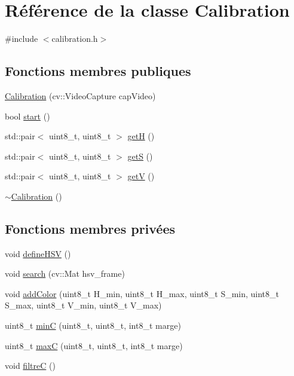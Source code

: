 \hypertarget{classCalibration}{\section{Référence de la classe Calibration}
\label{classCalibration}
}


{\ttfamily \#include $<$calibration.\-h$>$}

\subsection*{Fonctions membres publiques}
\begin{DoxyCompactItemize}
\item 
\hyperlink{classCalibration_a420bea981d91ac69161e400644ec7dd8}{Calibration} (cv\-::\-Video\-Capture cap\-Video)
\item 
bool \hyperlink{classCalibration_a066922eb7b40419ed4f850b3c6b4148d}{start} ()
\item 
std\-::pair$<$ uint8\-\_\-t, uint8\-\_\-t $>$ \hyperlink{classCalibration_ad5f6fcb712cd2ad1a44e19ff4e9058be}{get\-H} ()
\item 
std\-::pair$<$ uint8\-\_\-t, uint8\-\_\-t $>$ \hyperlink{classCalibration_a6bf68284373ae2468bd85043e48b8f25}{get\-S} ()
\item 
std\-::pair$<$ uint8\-\_\-t, uint8\-\_\-t $>$ \hyperlink{classCalibration_ac6b160de7e16702bb7938342c034477a}{get\-V} ()
\item 
\hyperlink{classCalibration_a108efb6ccd8c98e5cac950be4bf0ac26}{$\sim$\-Calibration} ()
\end{DoxyCompactItemize}
\subsection*{Fonctions membres privées}
\begin{DoxyCompactItemize}
\item 
void \hyperlink{classCalibration_adef7ee6cc7d95ea809c1cccd4d41ce02}{define\-H\-S\-V} ()
\item 
void \hyperlink{classCalibration_ad8250297ea60fa9c0ad1e38a70cca880}{search} (cv\-::\-Mat hsv\-\_\-frame)
\item 
void \hyperlink{classCalibration_ac4bdcbef3a615877cbeed352ea74c312}{add\-Color} (uint8\-\_\-t H\-\_\-min, uint8\-\_\-t H\-\_\-max, uint8\-\_\-t S\-\_\-min, uint8\-\_\-t S\-\_\-max, uint8\-\_\-t V\-\_\-min, uint8\-\_\-t V\-\_\-max)
\item 
uint8\-\_\-t \hyperlink{classCalibration_a0eb486ca50923fab9a39d4403c18d4cf}{min\-C} (uint8\-\_\-t, uint8\-\_\-t, int8\-\_\-t marge)
\item 
uint8\-\_\-t \hyperlink{classCalibration_a26be0ee9644bd758d60a22ffe1281bd6}{max\-C} (uint8\-\_\-t, uint8\-\_\-t, int8\-\_\-t marge)
\item 
void \hyperlink{classCalibration_ac016f08b033ba23b3036a87ab610946f}{filtre\-C} ()
\end{DoxyCompactItemize}
